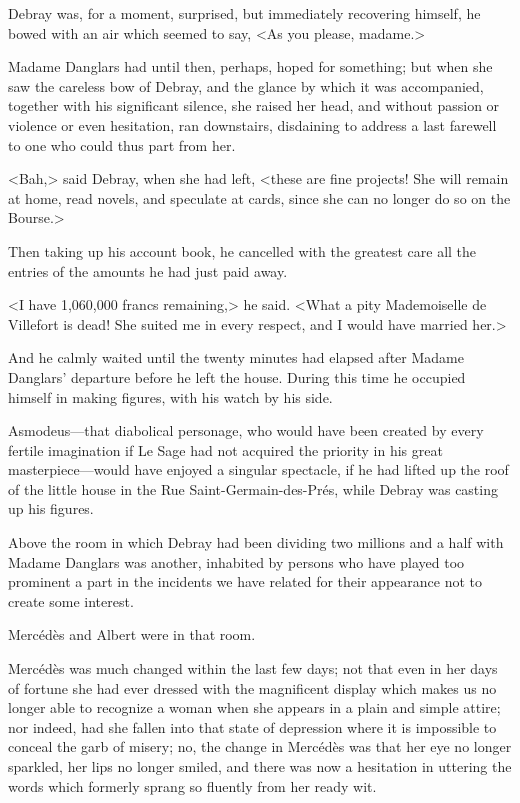  Debray was, for a moment, surprised, but immediately recovering himself, he bowed with an air which seemed to say, <As you please, madame.> 

 Madame Danglars had until then, perhaps, hoped for something; but when she saw the careless bow of Debray, and the glance by which it was accompanied, together with his significant silence, she raised her head, and without passion or violence or even hesitation, ran downstairs, disdaining to address a last farewell to one who could thus part from her. 

 <Bah,> said Debray, when she had left, <these are fine projects! She will remain at home, read novels, and speculate at cards, since she can no longer do so on the Bourse.> 

 Then taking up his account book, he cancelled with the greatest care all the entries of the amounts he had just paid away. 

 <I have 1,060,000 francs remaining,> he said. <What a pity Mademoiselle de Villefort is dead! She suited me in every respect, and I would have married her.> 

 And he calmly waited until the twenty minutes had elapsed after Madame Danglars' departure before he left the house. During this time he occupied himself in making figures, with his watch by his side. 

 Asmodeus—that diabolical personage, who would have been created by every fertile imagination if Le Sage had not acquired the priority in his great masterpiece—would have enjoyed a singular spectacle, if he had lifted up the roof of the little house in the Rue Saint-Germain-des-Prés, while Debray was casting up his figures. 

 Above the room in which Debray had been dividing two millions and a half with Madame Danglars was another, inhabited by persons who have played too prominent a part in the incidents we have related for their appearance not to create some interest. 

 Mercédès and Albert were in that room. 

 Mercédès was much changed within the last few days; not that even in her days of fortune she had ever dressed with the magnificent display which makes us no longer able to recognize a woman when she appears in a plain and simple attire; nor indeed, had she fallen into that state of depression where it is impossible to conceal the garb of misery; no, the change in Mercédès was that her eye no longer sparkled, her lips no longer smiled, and there was now a hesitation in uttering the words which formerly sprang so fluently from her ready wit. 

